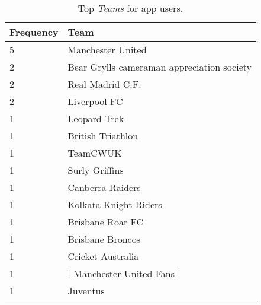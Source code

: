\begin{table}[h]
\begin{minipage}[b]{1.0\textwidth}
\centering
  \begin{tabular}{|l|l|} %
  \hline
  	\textbf{Frequency} & \textbf{Team} \\ \hline
		5 & Manchester United \\ \hline
		2 & Bear Grylls cameraman appreciation society \\ \hline
		2 & Real Madrid C.F. \\ \hline
		2 & Liverpool FC \\ \hline
		1 & Leopard Trek \\ \hline
		1 & British Triathlon \\ \hline
		1 & TeamCWUK \\ \hline
		1 & Surly Griffins \\ \hline
		1 & Canberra Raiders \\ \hline
		1 & Kolkata Knight Riders \\ \hline
		1 & Brisbane Roar FC \\ \hline
		1 & Brisbane Broncos \\ \hline
		1 & Cricket Australia \\ \hline
		1 & | Manchester United Fans | \\ \hline
		1 & Juventus \\ \hline
  \end{tabular}
  \caption{Top \emph{Teams} for app users.}
\end{minipage}
\end{table}


